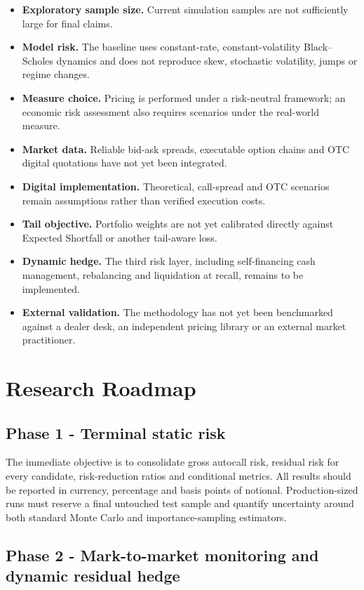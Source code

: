 \documentclass[11pt,a4paper]{article}
\begin{document}
\begin{itemize}
\item \textbf{Exploratory sample size.} Current simulation samples are not sufficiently large for final claims.
\item \textbf{Model risk.} The baseline uses constant-rate, constant-volatility Black--Scholes dynamics and does not reproduce skew, stochastic volatility, jumps or regime changes.
\item \textbf{Measure choice.} Pricing is performed under a risk-neutral framework; an economic risk assessment also requires scenarios under the real-world measure.
\item \textbf{Market data.} Reliable bid-ask spreads, executable option chains and OTC digital quotations have not yet been integrated.
\item \textbf{Digital implementation.} Theoretical, call-spread and OTC scenarios remain assumptions rather than verified execution costs.
\item \textbf{Tail objective.} Portfolio weights are not yet calibrated directly against Expected Shortfall or another tail-aware loss.
\item \textbf{Dynamic hedge.} The third risk layer, including self-financing cash management, rebalancing and liquidation at recall, remains to be implemented.
\item \textbf{External validation.} The methodology has not yet been benchmarked against a dealer desk, an independent pricing library or an external market practitioner.
\end{itemize}

\section{Research Roadmap}

\subsection{Phase 1 - Terminal static risk}

The immediate objective is to consolidate gross autocall risk, residual risk for every candidate, risk-reduction ratios and conditional metrics. All results should be reported in currency, percentage and basis points of notional. Production-sized runs must reserve a final untouched test sample and quantify uncertainty around both standard Monte Carlo and importance-sampling estimators.

\subsection{Phase 2 - Mark-to-market monitoring and dynamic residual hedge}
\end{document}

